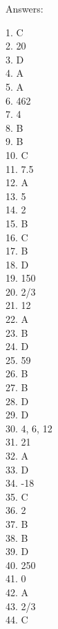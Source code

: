 \documentclass[../satmath.tex]{subfiles}
\begin{document}
\medbreak 
Answers:

1. C\\
2. 20\\
3. D\\
4. A\\
5. A\\
6. 462\\
7. 4\\
8. B\\
9. B\\
10. C\\
11. 7.5\\
12. A\\
13. 5\\
14. 2\\
15. B\\
16. C\\
17. B\\
18. D\\
19. 150\\
20. 2/3\\
21. 12\\
22. A\\
23. B\\
24. D\\
25. 59\\
26. B\\
27. B\\
28. D\\
29. D\\
30. 4, 6, 12\\
31. 21\\
32. A\\
33. D\\
34. -18\\
35. C\\
36. 2\\
37. B\\
38. B\\
39. D\\
40. 250\\
41. 0\\
42. A\\
43. 2/3\\
44. C
\end{document}
